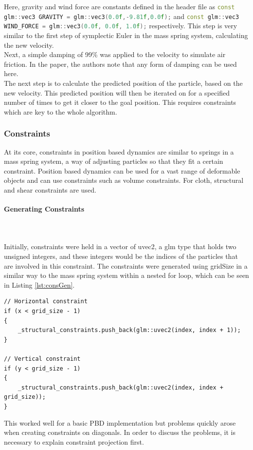 \documentclass[12pt,a4paper]{article}
\begin{document}
Here, gravity and wind force are constants defined in the header file as \lstinline[language=C++]!const glm::vec3 GRAVITY = glm::vec3(0.0f,-9.81f,0.0f);! and \lstinline[language=C++]!const glm::vec3 WIND_FORCE = glm::vec3(0.0f, 0.0f, 1.0f);! respectively. This step is very similar to the first step of symplectic Euler in the mass spring system, calculating the new velocity. \\

Next, a simple damping of 99\% was applied to the velocity to simulate air friction. In the paper, the authors note that any form of damping can be used here. \\

The next step is to calculate the predicted position of the particle, based on the new velocity. This predicted position will then be iterated on for a specified number of times to get it closer to the goal position. This requires constraints which are key to the whole algorithm.
\subsubsection{Constraints}
\label{constraints} 
At its core, constraints in position based dynamics are similar to springs in a mass spring system, a way of adjusting particles so that they fit a certain constraint. Position based dynamics can be used for a vast range of deformable objects and can use constraints such as volume constraints. For cloth, structural and shear constraints are used.
\paragraph{Generating Constraints}\mbox{} \\ \\
Initially, constraints were held in a vector of uvec2, a glm type that holds two unsigned integers, and these integers would be the indices of the particles that are involved in this constraint. The constraints were generated using gridSize in a similar way to the mass spring system within a nested for loop, which can be seen in Listing \ref{lst:consGen}. 
\begin{lstlisting}[caption={The inner loop for constraint generation},label={lst:consGen}]
// Horizontal constraint
if (x < grid_size - 1)
{
	_structural_constraints.push_back(glm::uvec2(index, index + 1));
}

// Vertical constraint
if (y < grid_size - 1)
{
	_structural_constraints.push_back(glm::uvec2(index, index + grid_size));
}
\end{lstlisting}
This worked well for a basic PBD implementation but problems quickly arose when creating constraints on diagonals. In order to discuss the problems, it is necessary to explain constraint projection first. 
\end{document}
